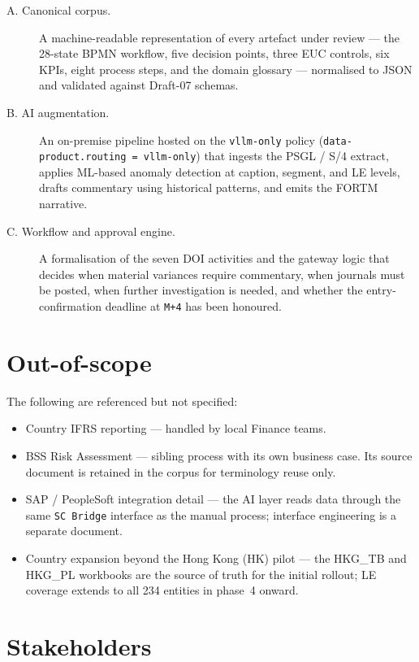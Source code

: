 \begin{description}
  \item[A. Canonical corpus.] A machine-readable representation of
        every artefact under review --- the 28-state BPMN workflow,
        five decision points, three EUC controls, six KPIs, eight
        process steps, and the domain glossary --- normalised to JSON
        and validated against Draft-07 schemas.
  \item[B. AI augmentation.] An on-premise pipeline hosted on the
        \texttt{vllm-only} policy (\texttt{data-product.routing = vllm-only})
        that ingests the PSGL / S/4 extract, applies ML-based anomaly
        detection at caption, segment, and LE levels, drafts commentary
        using historical patterns, and emits the FORTM narrative.
  \item[C. Workflow and approval engine.] A formalisation of the seven
        DOI activities and the gateway logic that decides when
        material variances require commentary, when journals must be
        posted, when further investigation is needed, and whether the
        entry-confirmation deadline at \texttt{M+4} has been honoured.
\end{description}

\section{Out-of-scope}

The following are referenced but not specified:

\begin{itemize}
  \item Country IFRS reporting --- handled by local Finance teams.
  \item BSS Risk Assessment --- sibling process with its own business
        case. Its source document is retained in the corpus for
        terminology reuse only.
  \item SAP / PeopleSoft integration detail --- the AI layer reads
        data through the same \texttt{SC Bridge} interface as the
        manual process; interface engineering is a separate document.
  \item Country expansion beyond the Hong Kong (HK) pilot --- the
        HKG\_TB and HKG\_PL workbooks are the source of truth for the
        initial rollout; LE coverage extends to all 234 entities in
        phase~4 onward.
\end{itemize}

\section{Stakeholders}

